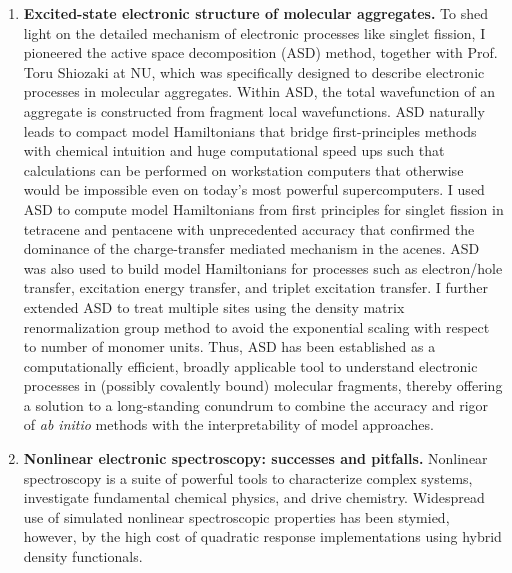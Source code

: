 \documentclass{nihbiosketch}
\begin{document}
\begin{enumerate}
  \item \begin{bibunit}[nih]
  \textbf{Excited-state electronic structure of molecular aggregates.}
  To shed light on the detailed mechanism of electronic processes like singlet fission,
  I pioneered the active space decomposition (ASD) method, together
  with Prof. Toru Shiozaki at NU, which was specifically designed to describe electronic processes
  in molecular aggregates.\cite{Parker2013JCP021108} Within ASD, the total wavefunction of an aggregate is
  constructed from fragment local wavefunctions.\cite{Parker2013JCP021108} ASD naturally leads to
  compact model Hamiltonians that bridge first-principles methods with chemical intuition and huge
  computational speed ups such that calculations can be performed on workstation computers
  that otherwise would be impossible even on today's most powerful supercomputers.
  I used ASD to compute model Hamiltonians from first principles for singlet fission in tetracene and pentacene
  with unprecedented accuracy that confirmed the dominance of the charge-transfer mediated mechanism
  in the acenes.\cite{Parker2014JPCC12700}
  ASD was also used to build model Hamiltonians
  for processes such as electron/hole transfer, excitation energy transfer, and triplet excitation transfer.\cite{Parker2014JCTC3738}
  I further extended ASD to treat multiple sites using the density matrix renormalization group method
  to avoid the exponential scaling with respect to number of monomer units.\cite{Parker2014JCP211102}
  Thus, ASD has been established as a computationally efficient, broadly applicable tool to understand
  electronic processes in (possibly covalently bound) molecular fragments, thereby offering a solution
  to a long-standing conundrum to combine the accuracy and rigor of \textit{ab initio} methods with
  the interpretability of model approaches.

  \renewcommand{\refname}{\vspace{-2em}}
  \end{bibunit}

  \item \begin{bibunit}[nih]
  \textbf{Nonlinear electronic spectroscopy: successes and pitfalls.}
  Nonlinear spectroscopy is a suite of powerful tools to characterize complex systems, investigate fundamental chemical
  physics, and drive chemistry. Widespread use of simulated nonlinear spectroscopic
  properties has been stymied, however, by the high cost of quadratic response implementations using hybrid density
  functionals.


\end{bibunit}
\end{enumerate}
\end{document}
